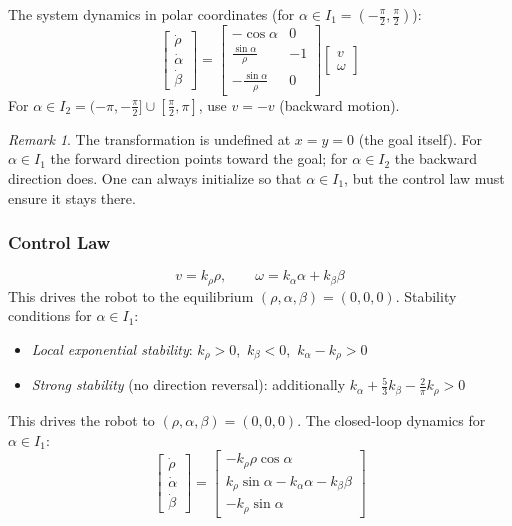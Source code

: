 \documentclass[11pt,a4paper]{article}
\theoremstyle{definition}
\theoremstyle{plain}
\theoremstyle{remark}
\newtheorem*{remark}{Remark}
\begin{document}
The system dynamics in polar coordinates (for $\alpha \in I_1 = (-\frac{\pi}{2}, \frac{\pi}{2})$):
\[
\begin{bmatrix} \dot{\rho} \\ \dot{\alpha} \\ \dot{\beta} \end{bmatrix}
= \begin{bmatrix} -\cos\alpha & 0 \\ \frac{\sin\alpha}{\rho} & -1 \\ -\frac{\sin\alpha}{\rho} & 0 \end{bmatrix}
\begin{bmatrix} v \\ \omega \end{bmatrix}
\]
For $\alpha \in I_2 = (-\pi, -\frac{\pi}{2}] \cup [\frac{\pi}{2}, \pi]$, use $v = -v$ (backward motion).

\begin{remark}
The transformation is undefined at $x = y = 0$ (the goal itself). For $\alpha \in I_1$ the forward direction points toward the goal; for $\alpha \in I_2$ the backward direction does. One can always initialize so that $\alpha \in I_1$, but the control law must ensure it stays there.
\end{remark}

\subsubsection*{Control Law}

\begin{tcolorbox}[colback=blue!5!white,colframe=blue!75!black,title=\textbf{Kinematic Feedback Control Law}]
\[
v = k_\rho \rho, \qquad \omega = k_\alpha \alpha + k_\beta \beta
\]
This drives the robot to the equilibrium $(\rho, \alpha, \beta) = (0, 0, 0)$. Stability conditions for $\alpha \in I_1$:
\begin{itemize}
    \item \textit{Local exponential stability}: $k_\rho > 0$,\ $k_\beta < 0$,\ $k_\alpha - k_\rho > 0$
    \item \textit{Strong stability} (no direction reversal): additionally $k_\alpha + \tfrac{5}{3}k_\beta - \tfrac{2}{\pi}k_\rho > 0$
\end{itemize}
\end{tcolorbox}

This drives the robot to $(\rho, \alpha, \beta) = (0, 0, 0)$. The closed-loop dynamics for $\alpha \in I_1$:
\[
\begin{bmatrix} \dot{\rho} \\ \dot{\alpha} \\ \dot{\beta} \end{bmatrix}
= \begin{bmatrix} -k_\rho \rho \cos\alpha \\ k_\rho \sin\alpha - k_\alpha\alpha - k_\beta\beta \\ -k_\rho \sin\alpha \end{bmatrix}
\]
\end{document}
